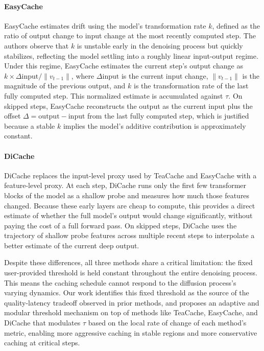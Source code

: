\documentclass{article}
\begin{document}
\paragraph{EasyCache}
EasyCache estimates drift using the model's transformation rate $k$, defined as the ratio of output change to input change at the most recently computed step. The authors observe that $k$ is unstable early in the denoising process but quickly stabilizes, reflecting the model settling into a roughly linear input-output regime. Under this regime, EasyCache estimates the current step's output change as $k \times \Delta\text{input} / \|v_{t-1}\|$, where $\Delta\text{input}$ is the current input change, $\|v_{t-1}\|$ is the magnitude of the previous output, and $k$ is the transformation rate of the last fully computed step. This normalized estimate is accumulated against $\tau$. On skipped steps, EasyCache reconstructs the output as the current input plus the offset $\Delta = \text{output} - \text{input}$ from the last fully computed step, which is justified because a stable $k$ implies the model's additive contribution is approximately constant. 
           
\paragraph{DiCache}
DiCache replaces the input-level proxy used by TeaCache and EasyCache with a feature-level proxy. At each step, DiCache runs only the first few transformer blocks of the model as a shallow probe and measures how much those features changed. Because these early layers are cheap to compute, this provides a direct estimate of whether the full model's output would change significantly, without paying the cost of a full forward pass. On skipped steps, DiCache uses the trajectory of shallow probe features across multiple recent steps to interpolate a better estimate of the current deep output.

Despite these differences, all three methods share a critical limitation: the fixed user-provided threshold is held constant throughout the entire denoising process. This means the caching schedule cannot respond to the diffusion process's varying dynamics. Our work identifies this fixed threshold as the source of the quality-latency tradeoff observed in prior methods, and proposes an adaptive and modular threshold mechanism on top of methods like TeaCache, EasyCache, and DiCache that modulates $\tau$ based on the local rate of change of each method's metric, enabling more aggressive caching in stable regions and more conservative caching at critical steps.
\end{document}
